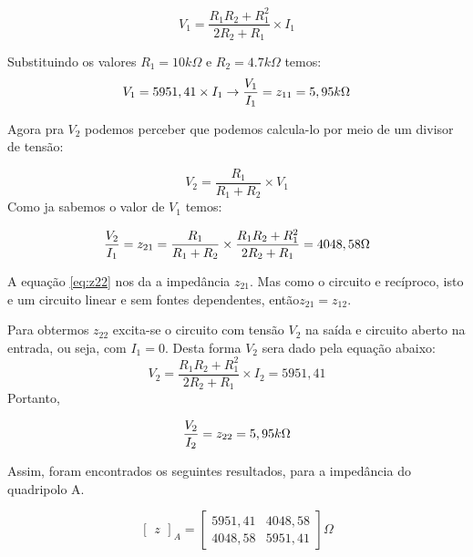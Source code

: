 \begin{equation}\label{eq:v1}
V_1 = \frac{R_1R_2+R_1^2}{2R_2+R_1}\times I_1
\end{equation}

Substituindo os valores $R_1=10k\Omega$ e $R_2=4.7k\Omega$ temos:
\begin{equation}\label{eq:z11}
V_1 = 5951,41\times I_1 \rightarrow {V_1 \over I_1} =z_{11}=5,95k\Omega 
\end{equation}

Agora pra $V_2$ podemos perceber que podemos calcula-lo por meio de um divisor de tensão:

\begin{equation}\label{eq:v2}
V_2 =  \frac{R_1}{R_1 + R_2} \times V_1
\end{equation}
Como ja sabemos o valor de ${V_1}$ temos:

\begin{equation}\label{eq:z22}
 {V_2 \over I_1} =z_{21}= \frac{R_1}{R_1 + R_2} \times \frac{R_1R_2+R_1^2}{2R_2+R_1} = 4048,58\Omega
\end{equation}

A equação \ref{eq:z22} nos da a impedância $z_{21}$. Mas como o circuito
e recíproco, isto e um circuito linear e sem fontes dependentes, então$ z_{21} = z_{12}$.


Para obtermos $z_{22}$ excita-se o circuito com tensão $V_2$ na saída e circuito aberto na entrada, ou seja, com $I_1 = 0$. Desta forma $V_2$ sera dado pela equação abaixo:
\begin{equation}\label{eq:v21}
V_2 = \frac{R_1R_2+R_1^2}{2R_2+R_1}\times I_2 = 5951,41
\end{equation}
Portanto,

\begin{equation}\label{eq:z22}
 {V_2 \over I_2} =z_{22}=5,95k\Omega 
\end{equation}

Assim, foram encontrados os seguintes
resultados, para a impedância do quadripolo A.

\begin{equation}
\left[ \begin{array}{c} z \end{array} \right]_A = 
\begin{bmatrix} 
5951,41 & 4048,58 \\
4048,58 & 5951,41
\end{bmatrix} 
\Omega
\label{teoA}
\end{equation}



